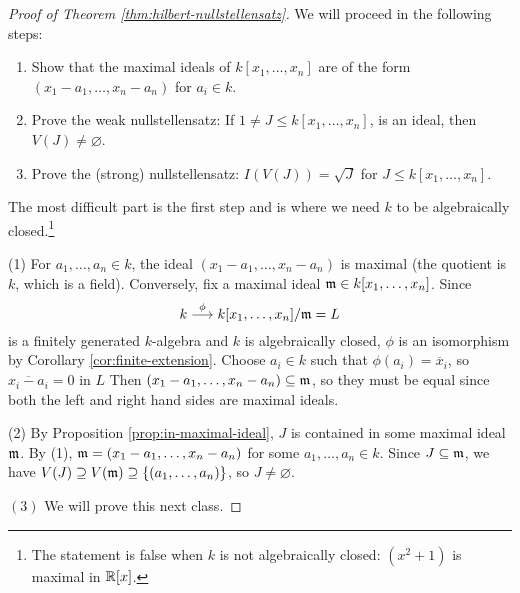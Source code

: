 \begin{proof}[Proof of Theorem \ref{thm:hilbert-nullstellensatz}]
  We will proceed in the following
  steps:
  \begin{enumerate}
    \item Show that the maximal ideals
      of $k[x_1, \dots, x_n]$ are
      of the form $(x_1 - a_1, \dots, x_n - a_n)$
      for $a_i \in k$.
    \item Prove the weak nullstellensatz:
      If $1 \ne J \le k[x_1, \dots, x_n]$,
      is an ideal, then $V(J) \ne \varnothing$.
    \item Prove the (strong) nullstellensatz:
      $I(V(J)) = \sqrt{J}$
      for $J \le k[x_1, \dots, x_n]$.
  \end{enumerate}
  The most difficult part is the first step
  and is where we need $k$ to be
  algebraically closed.\footnote{The statement is false when $k$ is not algebraically closed: $(x^2 + 1)$ is maximal in $\mathbb{R}[x]$.}

  (1) For $a_1, \dots, a_n \in k$, the
  ideal $(x_1 - a_1, \dots, x_n - a_n)$
  is maximal (the quotient is $k$, which
  is a field). Conversely, fix a maximal
  ideal $\mathfrak{m} \in k[x_1, \dots, x_n]$.
  Since
  \[
    k \overset{\phi}{\longrightarrow}
    k[x_1, \dots, x_n] / \mathfrak{m} = L
  \]
  is a finitely generated $k$-algebra and
  $k$ is algebraically closed,
  $\phi$ is an isomorphism by
  Corollary \ref{cor:finite-extension}.
  Choose $a_i \in k$ such that
  $\phi(a_i) = \overline{x}_i$, so
  $\overline{x_i - a_i} = 0$ in $L$
  Then $(x_1 - a_1, \dots, x_n - a_n) \subseteq \mathfrak{m}$, so they
  must be equal since both the left and
  right hand sides are maximal ideals.

  (2) By Proposition \ref{prop:in-maximal-ideal},
  $J$ is contained in some maximal ideal
  $\mathfrak{m}$. By (1), $\mathfrak{m} = (x_1 - a_1, \dots, x_n - a_n)$
  for some $a_1, \dots, a_n \in k$.
  Since $J \subseteq \mathfrak{m}$, we have
  $V(J) \supseteq V(\mathfrak{m}) \supseteq \{(a_1, \dots, a_n)\}$, so
  $J \ne \varnothing$.

  $(3)$ We will prove this next class.
\end{proof}
